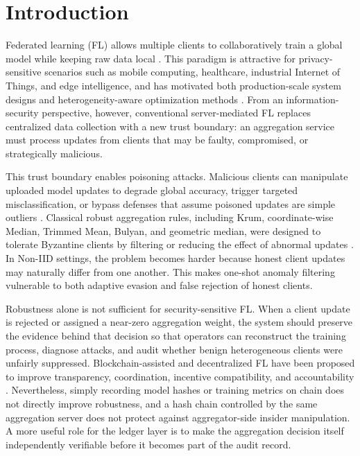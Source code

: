 \documentclass[preprint,authoryear,12pt]{elsarticle}
\begin{document}
\section{Introduction}

Federated learning (FL) allows multiple clients to collaboratively train a global model while keeping raw data local \citep{mcmahan2017fedavg,kairouz2021advances}. This paradigm is attractive for privacy-sensitive scenarios such as mobile computing, healthcare, industrial Internet of Things, and edge intelligence, and has motivated both production-scale system designs and heterogeneity-aware optimization methods \citep{bonawitz2019scale,li2020fedprox,karimireddy2020scaffold,reddi2021fedopt}. From an information-security perspective, however, conventional server-mediated FL replaces centralized data collection with a new trust boundary: an aggregation service must process updates from clients that may be faulty, compromised, or strategically malicious.

This trust boundary enables poisoning attacks. Malicious clients can manipulate uploaded model updates to degrade global accuracy, trigger targeted misclassification, or bypass defenses that assume poisoned updates are simple outliers \citep{fang2020local,bagdasaryan2020backdoor,baruch2019little,cao2021fltrust}. Classical robust aggregation rules, including Krum, coordinate-wise Median, Trimmed Mean, Bulyan, and geometric median, were designed to tolerate Byzantine clients by filtering or reducing the effect of abnormal updates \citep{blanchard2017krum,yin2018byzantine,elmhamdi2018bulyan,pillutla2022rfa}. In Non-IID settings, the problem becomes harder because honest client updates may naturally differ from one another. This makes one-shot anomaly filtering vulnerable to both adaptive evasion and false rejection of honest clients.

Robustness alone is not sufficient for security-sensitive FL. When a client update is rejected or assigned a near-zero aggregation weight, the system should preserve the evidence behind that decision so that operators can reconstruct the training process, diagnose attacks, and audit whether benign heterogeneous clients were unfairly suppressed. Blockchain-assisted and decentralized FL have been proposed to improve transparency, coordination, incentive compatibility, and accountability \citep{lu2020blockchain,nguyen2021blockchainedge,dong2024blockchain,zhang2024bitfl,ren2024bpfl,awan2022blockchainflsurvey,yuan2024dflsurvey,jiang2023blockflsurvey}. Nevertheless, simply recording model hashes or training metrics on chain does not directly improve robustness, and a hash chain controlled by the same aggregation server does not protect against aggregator-side insider manipulation. A more useful role for the ledger layer is to make the aggregation decision itself independently verifiable before it becomes part of the audit record.
\end{document}
